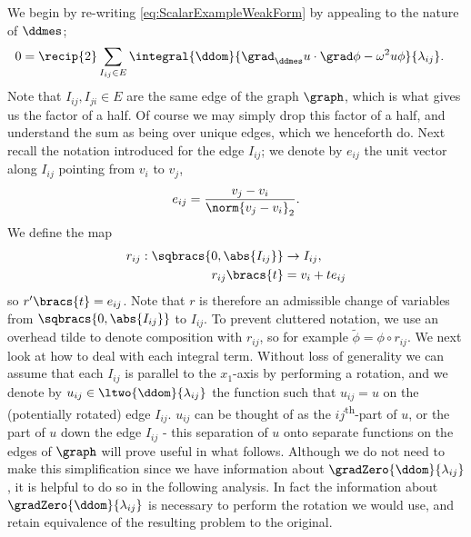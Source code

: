 We begin by re-writing \eqref{eq:ScalarExampleWeakForm} by appealing to the nature of $\ddmes$;
\begin{align} \label{eq:ScalarExampleSumOfInts}
	0 &= \recip{2}\sum_{I_{ij}\in E}\integral{\ddom}{\grad_\ddmes u \cdot \grad\phi - \omega^2 u\phi}{\lambda_{ij}}.
\end{align}
Note that $I_{ij},I_{ji}\in E$ are the same edge of the graph $\graph$, which is what gives us the factor of a half.
Of course we may simply drop this factor of a half, and understand the sum as being over unique edges, which we henceforth do.
Next recall the notation introduced for the edge $I_{ij}$; we denote by $e_{ij}$ the unit vector along $I_{ij}$ pointing from $v_i$ to $v_j$,
\begin{align*}
	e_{ij} = \frac{v_j-v_i}{\norm{v_j-v_i}_2}.
\end{align*}
We define the map 
\begin{align*}
	r_{ij}:\sqbracs{0,\abs{I_{ij}}} &\rightarrow I_{ij}, \\
	r_{ij}\bracs{t} &= v_i + te_{ij}
\end{align*}
so $r'\bracs{t}=e_{ij}$.
Note that $r$ is therefore an admissible change of variables from $\sqbracs{0,\abs{I_{ij}}}$ to $I_{ij}$.
To prevent cluttered notation, we use an overhead tilde to denote composition with $r_{ij}$, so for example $\tilde{\phi}=\phi\circ r_{ij}$.
We next look at how to deal with each integral term.
Without loss of generality we can assume that each $I_{ij}$ is parallel to the $x_1$-axis by performing a rotation, and we denote by $u_{ij}\in\ltwo{\ddom}{\lambda_{ij}}$ the function such that $u_{ij}=u$ on the (potentially rotated) edge $I_{ij}$.
$u_{ij}$ can be thought of as the $ij$\textsuperscript{th}-part of $u$, or the part of $u$ down the edge $I_{ij}$ - this separation of $u$ onto separate functions on the edges of $\graph$ will prove useful in what follows.
Although we do not need to make this simplification since we have information about $\gradZero{\ddom}{\lambda_{ij}}$, it is helpful to do so in the following analysis.
In fact the information about $\gradZero{\ddom}{\lambda_{ij}}$ is necessary to perform the rotation we would use, and retain equivalence of the resulting problem to the original. \newline

